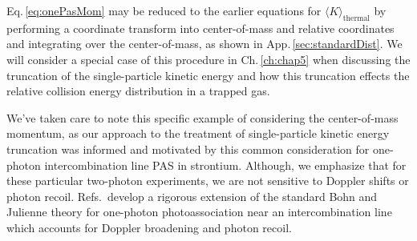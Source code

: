 Eq.\,\ref{eq:onePasMom} may be reduced to the earlier equations for $\langle K \rangle_\text{thermal}$ by performing a coordinate transform into center-of-mass and relative coordinates and integrating over the center-of-mass, as shown in App.\,\ref{sec:standardDist}.
We will consider a special case of this procedure in Ch.\,\ref{ch:chap5} when discussing the truncation of the single-particle kinetic energy and how this truncation effects the relative collision energy distribution in a trapped gas.

We've taken care to note this specific example of considering the center-of-mass momentum, as our approach to the treatment of single-particle kinetic energy truncation was informed and motivated by this common consideration for one-photon intercombination line PAS in strontium.
Although, we emphasize that for these particular two-photon experiments, we are not sensitive to Doppler shifts or photon recoil.
Refs.\,\cite{Ciuryo2004, Borkowski2014a} develop a rigorous extension of the standard Bohn and Julienne theory for one-photon photoassociation near an intercombination line which accounts for Doppler broadening and photon recoil.



%
%
%
%
%

